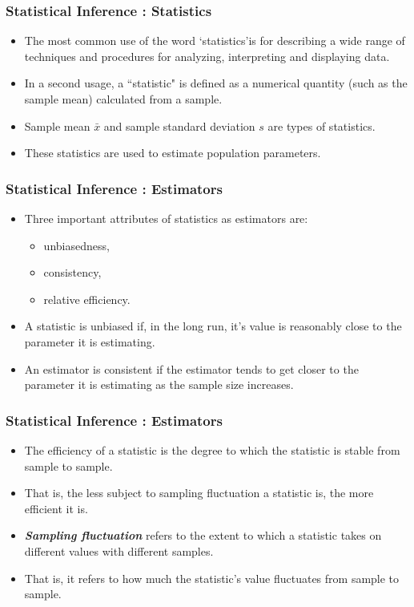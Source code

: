 

\begin{frame}
\frametitle{Statistical Inference : Statistics}
\begin{itemize}
\item The most common use of the word `statistics'is for describing a wide range of techniques and procedures for analyzing, interpreting and displaying data.
\item In a second usage, a ``statistic" is defined as a numerical quantity (such as the sample mean) calculated from a sample.
\item Sample mean $\bar{x}$ and sample standard deviation $s$ are types of statistics.
\item These statistics are used to estimate population parameters.
\end{itemize}
\end{frame}

\begin{frame}
\frametitle{Statistical Inference : Estimators}
\begin{itemize}
\item Three important attributes of statistics as estimators are: \begin{itemize} \large
\item unbiasedness, \item consistency,  \item  relative efficiency.\end{itemize}
\item A statistic is unbiased if, in the long run, it's value is reasonably close to the parameter it is estimating.
\item An estimator is consistent if the estimator tends to get closer to the parameter it is estimating as the sample size increases.
\end{itemize}
\end{frame}

\begin{frame}
\frametitle{Statistical Inference : Estimators}
\begin{itemize}

\item The efficiency of a statistic is the degree to which the statistic is stable from sample to sample.
\item That is, the less subject to sampling fluctuation a statistic is, the more efficient it is.
\item \textbf{\emph{Sampling fluctuation}} refers to the extent to which a statistic takes on different values with different samples.
\item That is, it refers to how much the statistic's value fluctuates from sample to sample.

\end{itemize}
\end{frame}

